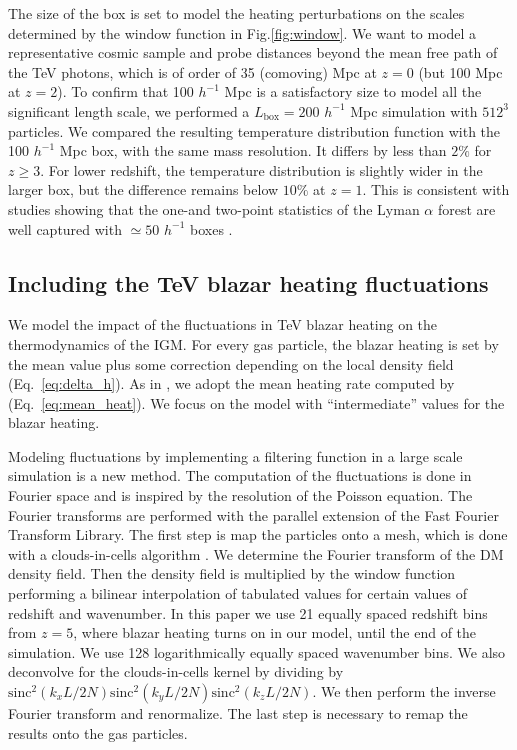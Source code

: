 \documentclass[twocolumns]{emulateapj}
\begin{document}
The size of the box is set to model the heating perturbations on the scales determined by the window function in Fig.\ref{fig:window}. We want to model a representative cosmic sample and probe distances beyond the mean free path of the TeV photons, which is of order of 35 (comoving) Mpc at $z=0$ (but 100 Mpc at $z=2$).  To confirm that 100 $h^{-1}$ Mpc is a satisfactory size to model all the significant length scale, we performed a $L_\mathrm{box}=200 $ $h^{-1}$ Mpc simulation with $512^3$ particles. We compared the resulting temperature distribution function with the 100 $h^{-1}$ Mpc box, with the same mass resolution.  It differs by less than $2\%$ for $z\geqslant 3$. For lower redshift, the temperature distribution is slightly wider in the larger box, but the difference remains below $10\%$ at $z=1$. This is consistent with studies showing that the one-and two-point statistics of the Lyman $\alpha$ forest are well captured with $\simeq 50$ $h^{-1}$ boxes \citep{2007MNRAS.374..196R,2009MNRAS.398L..26B}.



\subsection{Including the TeV blazar heating fluctuations}
We model the impact of the fluctuations in TeV blazar heating on the thermodynamics of the IGM. For every gas particle, the blazar heating is set by the mean value plus some correction depending on the local density field (Eq.~\eqref{eq:delta_h}). As in \citet{2012MNRAS.423..149P}, we adopt the mean heating rate computed by \citet{2012ApJ...752...23C} (Eq.~\eqref{eq:mean_heat}). We focus on the model with ``intermediate'' values for the blazar heating.

Modeling fluctuations by implementing a filtering function in a large scale simulation is a new method. The computation of the fluctuations is done in Fourier space and is inspired by the resolution of the Poisson equation. The Fourier transforms are performed with the parallel extension of the Fast Fourier Transform Library. The first step is map the particles onto a mesh, which is done with a clouds-in-cells algorithm \citep{1981csup.book.....H}. We determine the Fourier transform of the DM density field. Then the density field is multiplied by the window function performing a bilinear interpolation of tabulated values for certain values of redshift and wavenumber. In this paper we use 21 equally spaced redshift bins from $z=5$, where blazar heating turns on in our model, until the end of the simulation. We use 128 logarithmically equally spaced wavenumber bins. We also deconvolve for the clouds-in-cells kernel by dividing by $\mathrm{sinc}^2(k_x L/2N)\mathrm{sinc}^2(k_y L/2N)\mathrm{sinc}^2(k_z L/2N)$. We then perform the inverse Fourier transform and renormalize. The last step is necessary to remap the results onto the gas particles.
\end{document}
